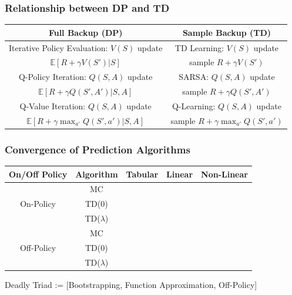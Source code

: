 \documentclass[handout]{beamer}
\newcommand{\cmark}{\ding{51}}%
\newcommand{\xmark}{\ding{55}}%
\begin{document}
\begin{frame}
\frametitle{Relationship between DP and TD}
\pause
\begin{center}
      \begin{tabular}{c|c}
      {\bf Full Backup (DP)} & {\bf Sample Backup (TD)} \\ \hline
       Iterative Policy Evaluation: $V(S)$ update & TD Learning: $V(S)$ update \\
       $\mathbb{E}[R + \gamma V(S')|S]$ & sample $R + \gamma V(S')$ \\ \hline
      Q-Policy Iteration: $Q(S,A)$ update & SARSA: $Q(S,A)$ update \\
       $\mathbb{E}[R + \gamma Q(S',A')|S,A]$ & sample $R + \gamma Q(S',A')$ \\ \hline
       Q-Value Iteration: $Q(S,A)$ update & Q-Learning: $Q(S,A)$ update \\
       $\mathbb{E}[R + \gamma \max_{a'} Q(S',a')|S,A]$ & sample $R + \gamma \max_{a' } Q(S',a')$ \\ \hline
      \end{tabular} 
\end{center}      
\end{frame}

\begin{frame}
\frametitle{Convergence of Prediction Algorithms}
\pause
\begin{center}
      \begin{tabular}{ccccc}
      \hline
      On/Off Policy & Algorithm & Tabular & Linear & Non-Linear \\ \hline
      \multirow{3}{*}{On-Policy} & MC & \cmark & \cmark & \cmark \\
      & TD(0) & \cmark & \cmark & \xmark \\
      & TD($\lambda$) & \cmark & \cmark & \xmark \\ \hline
      \multirow{3}{*}{Off-Policy} & MC & \cmark & \cmark & \cmark \\
      & TD(0) & \cmark & \xmark & \xmark \\
      & TD($\lambda$) & \cmark & \xmark & \xmark \\ \hline
      \end{tabular}
\end{center}      
\pause
Deadly Triad := [Bootstrapping, Function Approximation, Off-Policy]
\end{frame}
\end{document}
